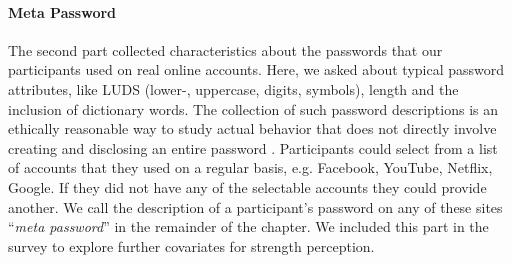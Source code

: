 \paragraph{Meta Password} The second part collected characteristics about the passwords that our participants used on real online accounts. Here, we asked about typical password attributes, like LUDS (lower-, uppercase, digits, symbols), length and the inclusion of dictionary words. The collection of such password descriptions is an ethically reasonable way to study actual behavior that does not directly involve creating and disclosing an entire password \cite{VonZezschwitz2013SurvivalShortest}. Participants could select from a list of accounts that they used on a regular basis, e.g. Facebook, YouTube, Netflix, Google. If they did not have any of the selectable accounts they could provide another. We call the description of a participant's password on any of these sites ``\textit{meta password}'' in the remainder of the chapter. We included this part in the survey to explore further covariates for strength perception.



